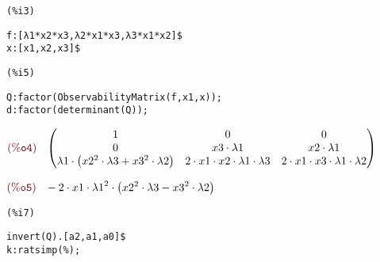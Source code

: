 \noindent
\begin{minipage}[t]{8ex}\color{red}\bf
\begin{verbatim}
(%i3) 
\end{verbatim}
\end{minipage}
\begin{minipage}[t]{\textwidth}\color{blue}
\begin{verbatim}
f:[λ1*x2*x3,λ2*x1*x3,λ3*x1*x2]$
x:[x1,x2,x3]$
\end{verbatim}
\end{minipage}

\smallskip

\noindent
\begin{minipage}[t]{8ex}\color{red}\bf
\begin{verbatim}
(%i5) 
\end{verbatim}
\end{minipage}
\begin{minipage}[t]{\textwidth}\color{blue}
\begin{verbatim}
Q:factor(ObservabilityMatrix(f,x1,x));
d:factor(determinant(Q));
\end{verbatim}
\end{minipage}

\noindent
$\displaystyle
\parbox{8ex}{$\color{labelcolor}\mathrm{\tt (\%o4) }\quad $}
\begin{pmatrix}1 & 0 & 0\cr 0 & {x3}\cdot {\lambda1} & {x2}\cdot {\lambda1}\cr {\lambda1}\cdot \left( {{{x2}}^{2}}\cdot {\lambda3}+{{{x3}}^{2}}\cdot {\lambda2}\right)  & 2\cdot {x1}\cdot {x2}\cdot {\lambda1}\cdot {\lambda3} & 2\cdot {x1}\cdot {x3}\cdot {\lambda1}\cdot {\lambda2}\end{pmatrix}
$

\noindent
$\displaystyle
\parbox{8ex}{$\color{labelcolor}\mathrm{\tt (\%o5) }\quad $}
-2\cdot {x1}\cdot {{{\lambda1}}^{2}}\cdot \left( {{{x2}}^{2}}\cdot {\lambda3}-{{{x3}}^{2}}\cdot {\lambda2}\right) \mbox{}
$


\noindent
\begin{minipage}[t]{8ex}\color{red}\bf
\begin{verbatim}
(%i7) 
\end{verbatim}
\end{minipage}
\begin{minipage}[t]{\textwidth}\color{blue}
\begin{verbatim}
invert(Q).[a2,a1,a0]$
k:ratsimp(%);
\end{verbatim}
\end{minipage}

